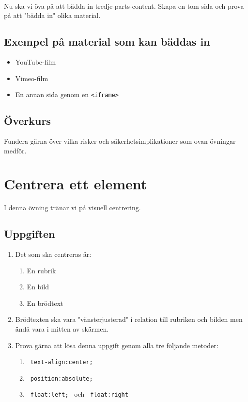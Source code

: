 \documentclass{article}
\begin{document}
    \paragraph{}
    Nu ska vi öva på att bädda in tredje-parts-content. Skapa en tom sida och prova på att "bädda in" olika material.

    \subsection*{Exempel på material som kan bäddas in}
      \begin{itemize}
        \item YouTube-film
        \item Vimeo-film
        \item En annan sida genom en \texttt{<iframe>}
      \end{itemize}

    \subsection*{Överkurs}
      Fundera gärna över vilka risker och säkerhetsimplikationer som ovan övningar medför.






  \newpage
  \section{ Centrera ett element }
    \paragraph{}
    I denna övning tränar vi på visuell centrering.

    \subsection*{Uppgiften}
      \begin{enumerate}
        \item
          Det som ska centreras är:
          \begin{enumerate}
            \item En rubrik
            \item En bild
            \item En brödtext
          \end{enumerate}
        \item Brödtexten ska vara "vänsterjusterad" i relation till rubriken och bilden men ändå vara i mitten av skärmen.
        \item Prova gärna att lösa denna uppgift genom alla tre följande metoder:
          \begin{enumerate}
            \item \texttt{ text-align:center; }
            \item \texttt{ position:absolute; }
            \item \texttt{ float:left; } och \texttt{ float:right }
          \end{enumerate}
      \end{enumerate}
\end{document}
